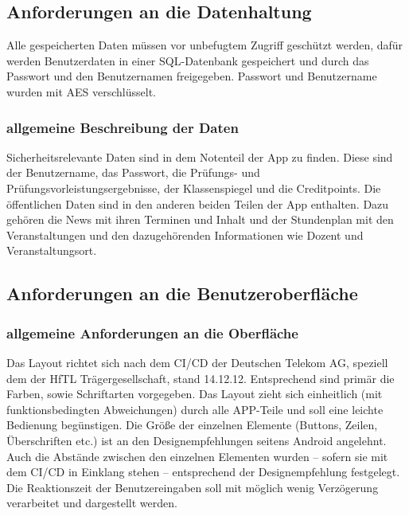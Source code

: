 \subsection{\textbf{Anforderungen an die Datenhaltung}}

Alle gespeicherten Daten müssen vor unbefugtem Zugriff geschützt werden, dafür werden Benutzerdaten in einer \acs{SQL}-Datenbank gespeichert und durch das Passwort und den Benutzernamen freigegeben. Passwort und Benutzername wurden mit \acs{AES} verschlüsselt.

\subsubsection{allgemeine Beschreibung der Daten}
Sicherheitsrelevante Daten sind in dem Notenteil der App zu finden. Diese sind der Benutzername, das Passwort, die Prüfungs- und Prüfungsvorleistungsergebnisse, der Klassenspiegel und die Creditpoints.
Die öffentlichen Daten sind in den anderen beiden Teilen der App enthalten.
Dazu gehören die News mit ihren Terminen und Inhalt und der Stundenplan mit den Veranstaltungen und den dazugehörenden Informationen wie Dozent und Veranstaltungsort.


\subsection{\textbf{Anforderungen an die Benutzeroberfläche}}

\subsubsection{allgemeine Anforderungen an die Oberfläche}

Das Layout richtet sich nach dem  \ac{CI/CD} der Deutschen Telekom AG, speziell dem der \acs{HfTL} Trägergesellschaft, stand 14.12.12. Entsprechend sind primär die Farben, sowie Schriftarten vorgegeben. Das Layout zieht sich einheitlich (mit funktionsbedingten Abweichungen) durch alle APP-Teile und soll eine leichte Bedienung begünstigen.
Die Größe der einzelnen Elemente (Buttons, Zeilen, Überschriften etc.) ist an den Designempfehlungen seitens Android angelehnt. 
Auch die Abstände zwischen den einzelnen Elementen wurden – sofern sie mit dem \ac{CI/CD} in Einklang stehen – entsprechend der Designempfehlung festgelegt.
Die Reaktionszeit der Benutzereingaben soll mit möglich wenig Verzögerung verarbeitet und dargestellt werden.






